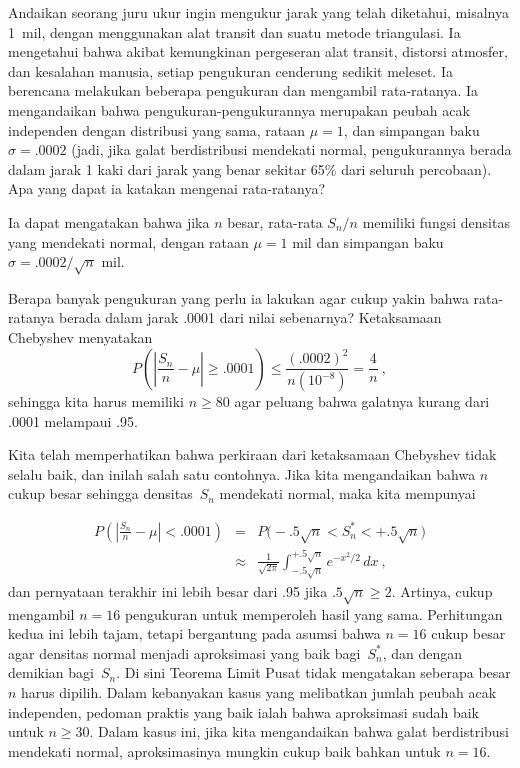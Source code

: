\begin{example}\label{exam 9.10}
Andaikan seorang juru ukur ingin mengukur jarak yang telah diketahui, misalnya 1~mil, dengan
menggunakan alat transit dan suatu metode triangulasi.  Ia mengetahui bahwa akibat kemungkinan
pergeseran alat transit, distorsi atmosfer, dan kesalahan manusia, setiap pengukuran cenderung
sedikit meleset.  Ia berencana melakukan beberapa pengukuran dan mengambil rata-ratanya.  Ia
mengandaikan bahwa pengukuran-pengukurannya merupakan peubah acak independen dengan distribusi yang
sama, rataan $\mu = 1$, dan simpangan baku $\sigma = .0002$ (jadi, jika galat berdistribusi
mendekati normal, pengukurannya berada dalam jarak 1 kaki dari jarak yang benar sekitar 65\% dari
seluruh percobaan).  Apa yang dapat ia katakan mengenai rata-ratanya?
\par
Ia dapat mengatakan bahwa jika $n$ besar, rata-rata $S_n/n$ memiliki fungsi densitas yang mendekati
normal, dengan rataan $\mu = 1$ mil dan simpangan baku $\sigma = .0002/\sqrt n$ mil.

Berapa banyak pengukuran yang perlu ia lakukan agar cukup yakin bahwa rata-ratanya berada dalam
jarak .0001 dari nilai sebenarnya?  Ketaksamaan Chebyshev menyatakan
$$
P\left(\left| \frac {S_n}n - \mu \right| \geq .0001 \right) \leq \frac
{(.0002)^2}{n(10^{-8})} = \frac 4n\ ,
$$
sehingga kita harus memiliki $n \ge 80$ agar peluang bahwa galatnya kurang dari .0001 melampaui
.95.
\par
Kita telah memperhatikan bahwa perkiraan dari ketaksamaan Chebyshev tidak selalu baik, dan inilah
salah satu contohnya.  Jika kita mengandaikan bahwa $n$ cukup besar sehingga densitas~$S_n$
mendekati normal, maka kita mempunyai
\par
\begin{eqnarray*}
P\left(\left| \frac {S_n}n - \mu \right| < .0001 \right) &=& P\bigl(-.5\sqrt{n} < S_n^*
< +.5\sqrt{n}\bigr) \\
     &\approx& \frac 1{\sqrt{2\pi}} \int_{-.5\sqrt{n}}^{+.5\sqrt{n}} e^{-x^2/2}\, dx\ ,
\end{eqnarray*}
dan pernyataan terakhir ini lebih besar dari .95 jika $.5\sqrt{n} \ge 2.$  Artinya, cukup mengambil
$n = 16$ pengukuran untuk memperoleh hasil yang sama.  Perhitungan kedua ini lebih tajam, tetapi
bergantung pada asumsi bahwa $n = 16$ cukup besar agar densitas normal menjadi aproksimasi yang baik
bagi~$S_n^*$, dan dengan demikian bagi~$S_n$.  Di sini Teorema Limit Pusat tidak mengatakan seberapa
besar $n$ harus dipilih.  Dalam kebanyakan kasus yang melibatkan jumlah peubah acak independen,
pedoman praktis yang baik ialah bahwa aproksimasi sudah baik untuk $n \ge 30$.  Dalam kasus ini,
jika kita mengandaikan bahwa galat berdistribusi mendekati normal, aproksimasinya mungkin cukup baik
bahkan untuk $n = 16$.
\end{example}

